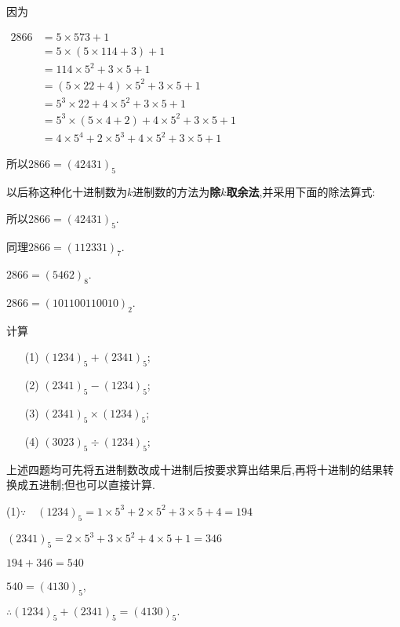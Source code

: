 \solve 因为

$\begin{aligned} 2866 &=5 \times 573+1 \\ &=5 \times(5 \times 114+3)+1 \\ &=114 \times 5^{2}+3 \times 5+1 \\ &=(5 \times 22+4) \times 5^{2}+3 \times 5+1 \\ &=5^{3} \times 22+4 \times 5^{2}+3 \times 5+1 \\ &=5^{3} \times(5 \times 4+2)+4 \times 5^{2}+3 \times 5+1 \\ &=4 \times 5^{4}+2 \times 5^{3}+4 \times 5^{2}+3 \times 5+1 \end{aligned}$

所以$2866=(42431)_{5}$

以后称这种化十进制数为$k$进制数的方法为\textbf{除$k$取余法},并采用下面的除法算式:

\begin{center}
	\quad
\end{center}

所以$2866=(42431)_{5}$.

同理$2866=(112331)_{7}$.

$2866=(5462)_{8}$.

$2866=(101 100 110 010)_{2}$.

\example 计算
\begin{enumerate}[itemindent=2em]
	\item[(1)] $(1234)_{5}+(2341)_{5}$;
	\item[(2)] $(2341)_{5}-(1234)_{5}$;
	\item[(3)] $(2341)_{5}\times(1234)_{5}$;
	\item[(4)] $(3023)_{5}\div(1234)_{5}$;
\end{enumerate}

\solve 上述四题均可先将五进制数改成十进制后按要求算出结果后,再将十进制的结果转换成五进制;但也可以直接计算.

(1)$\because \quad(1234)_{5}=1 \times 5^{3}+2 \times 5^{2}+3 \times 5+4=194$

$(2341)_{5}=2 \times 5^{3}+3 \times 5^{2}+4 \times 5+1=346$

$194+346=540$

\begin{center}
	\quad
\end{center}

$540=(4130)_{5}$,

$\therefore(1234)_{5}+(2341)_{5}=(4130)_{5} .$


